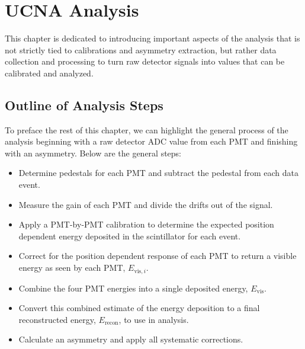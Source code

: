 \chapter{UCNA Analysis}
\label{ch:UCNA_Analysis}

This chapter is dedicated to introducing important aspects of the analysis that
is not strictly tied to calibrations and asymmetry extraction, but rather
data collection and processing to turn raw detector signals into values that
can be calibrated and analyzed. 






\section{Outline of Analysis Steps} \label{sec:outline}

To preface the rest of this chapter, we can highlight
the general process of the analysis beginning with a raw detector
ADC value from each PMT and finishing with an asymmetry.
Below are the general steps:

\begin{itemize}
\item Determine pedestals for each PMT and subtract the pedestal from each data event.
\item Measure the gain of each PMT and divide the drifts out of the signal.
\item Apply a PMT-by-PMT calibration to determine the expected position dependent
  energy deposited in the scintillator
  for each event.
\item Correct for the position dependent response of each PMT
  to return a visible energy as seen by each PMT, $E_{\mathrm{vis},i}$.
\item Combine the four PMT energies into a single deposited energy, $E_{\mathrm{vis}}$.
\item Convert this combined estimate of the energy deposition to a final
  reconstructed energy, $E_{\mathrm{recon}}$, to use in analysis.
\item Calculate an asymmetry and apply all systematic corrections.
\end{itemize}

